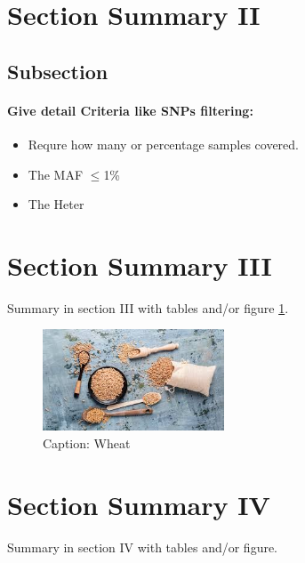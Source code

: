 \documentclass[9pt,twocolumn]{report}
\begin{document}
\section{Section Summary II}

\subsection{Subsection}
\paragraph{Give detail Criteria like SNPs filtering:}
\begin{itemize}
		\item Requre how many or percentage samples covered.
		\item The MAF $\leqslant$1\%
		\item The Heter
\end{itemize}	

\section{Section Summary III}
Summary in section III with tables and/or figure \ref{wheat:fig}.


\begin{figure}[ht]
\centering
\includegraphics[width=0.48\textwidth]{wheat.jpeg} %
\caption{Caption: Wheat}
\label{wheat:fig}
\end{figure}

\section{Section Summary IV}
Summary in section IV with tables and/or figure.%

\end{document}

